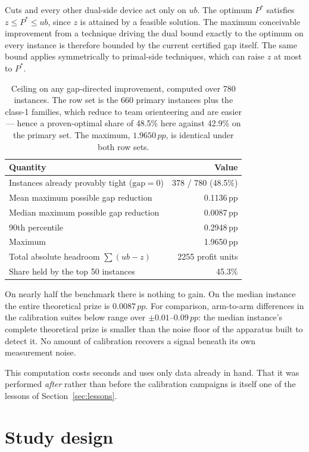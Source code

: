 \documentclass[11pt,a4paper]{article}
\newcommand{\pp}{\,pp}
\begin{document}
Cuts and every other dual-side device act only on $ub$. The optimum $P^\ast$
satisfies $z\le P^\ast\le ub$, since $z$ is attained by a feasible solution. The
maximum conceivable improvement from a technique driving the dual bound exactly to
the optimum on every instance is therefore bounded by the current certified gap
itself. The same bound applies symmetrically to primal-side techniques, which can
raise $z$ at most to $P^\ast$.

\begin{table}[htbp]
\centering
\caption{Ceiling on any gap-directed improvement, computed over 780 instances.
The row set is the 660 primary instances plus the class-1 families, which reduce
to team orienteering and are easier --- hence a proven-optimal share of 48.5\% here
against 42.9\% on the primary set. The maximum, $1.9650\pp$, is identical under
both row sets.}
\label{tab:ceiling}
\begin{tabular}{lr}
\toprule
Quantity & Value \\
\midrule
Instances already provably tight ($\text{gap}=0$) & 378 / 780 \;(48.5\%) \\
Mean maximum possible gap reduction & 0.1136\pp \\
Median maximum possible gap reduction & 0.0087\pp \\
90th percentile & 0.2948\pp \\
Maximum & 1.9650\pp \\
\midrule
Total absolute headroom $\sum(ub-z)$ & 2255 profit units \\
Share held by the top 50 instances & 45.3\% \\
\bottomrule
\end{tabular}
\end{table}

On nearly half the benchmark there is nothing to gain. On the median instance the
entire theoretical prize is $0.0087\pp$. For comparison, arm-to-arm differences in
the calibration suites below range over $\pm0.01$--$0.09\pp$: the median instance's
complete theoretical prize is smaller than the noise floor of the apparatus built
to detect it. No amount of calibration recovers a signal beneath its own
measurement noise.

This computation costs seconds and uses only data already in hand. That it was
performed \emph{after} rather than before the calibration campaigns is itself one
of the lessons of Section~\ref{sec:lessons}.

\section{Study design}\label{sec:design}
\end{document}

